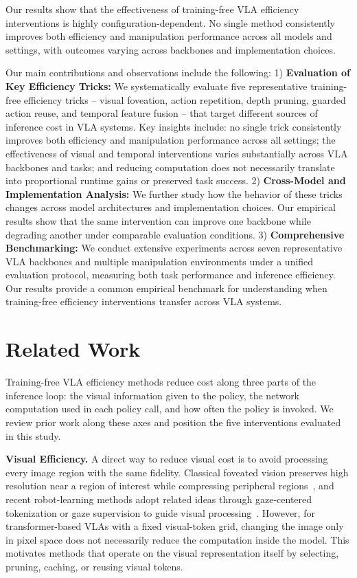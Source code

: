 \documentclass[letterpaper, 10 pt, conference]{ieeeconf}
\begin{document}
Our results show that the effectiveness of training-free VLA efficiency interventions is highly configuration-dependent. No single method consistently improves both efficiency and manipulation performance across all models and settings, with outcomes varying across backbones and implementation choices.

Our main contributions and observations include the following: 1) \textbf{Evaluation of Key Efficiency Tricks:} We systematically evaluate five representative training-free efficiency tricks -- visual foveation, action repetition, depth pruning, guarded action reuse, and temporal feature fusion -- that target different sources of inference cost in VLA systems. Key insights include: no single trick consistently improves both efficiency and manipulation performance across all settings; the effectiveness of visual and temporal interventions varies substantially across VLA backbones and tasks; and reducing computation does not necessarily translate into proportional runtime gains or preserved task success. 2) \textbf{Cross-Model and Implementation Analysis:} We further study how the behavior of these tricks changes across model architectures and implementation choices. Our empirical results show that the same intervention can improve one backbone while degrading another under comparable evaluation conditions. 3) \textbf{Comprehensive Benchmarking:} We conduct extensive experiments across seven representative VLA backbones and multiple manipulation environments under a unified evaluation protocol, measuring both task performance and inference efficiency. Our results provide a common empirical benchmark for understanding when training-free efficiency interventions transfer across VLA systems.


\section{Related Work}

Training-free VLA efficiency methods reduce cost along three parts of the inference loop: the visual information given to the policy, the network computation used in each policy call, and how often the policy is invoked. We review prior work along these axes and position the five interventions evaluated in this study.

\noindent\textbf{Visual Efficiency.}
A direct way to reduce visual cost is to avoid processing every image region with the same fidelity. Classical foveated vision preserves high resolution near a region of interest while compressing peripheral regions~\cite{schwartz,traver}, and recent robot-learning methods adopt related ideas through gaze-centered tokenization or gaze supervision to guide visual processing~\cite{lookfocusact,gazereg}. However, for transformer-based VLAs with a fixed visual-token grid, changing the image only in pixel space does not necessarily reduce the computation inside the model. This motivates methods that operate on the visual representation itself by selecting, pruning, caching, or reusing visual tokens.
\end{document}
